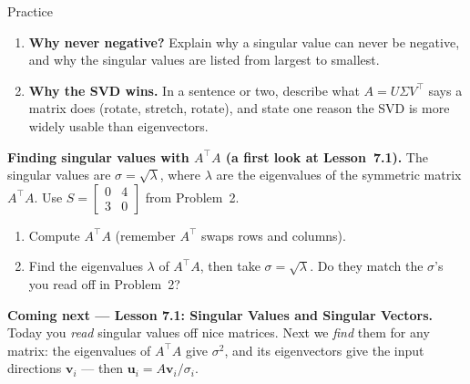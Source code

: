\documentclass[10pt]{article}
\newcommand{\uu}{\mathbf{u}}
\newcommand{\vv}{\mathbf{v}}
\newcommand{\T}{^{\top}}
\begin{document}
\begin{notesbox}{Practice}
\begin{enumerate}[leftmargin=1.9em, itemsep=12pt]
        perpendicular eigenvectors. Compute $A\begin{bmatrix} 1 \\ 1 \end{bmatrix}$ and
        $A\begin{bmatrix} 1 \\ -1 \end{bmatrix}$, and read off the singular values. 
  \item \textbf{Why never negative?} Explain why a singular value can never be negative, and why the
        singular values are listed from largest to smallest. 
  \item \textbf{Why the SVD wins.} In a sentence or two, describe what $A=U\Sigma V\T$ says a matrix does
        (rotate, stretch, rotate), and state one reason the SVD is more widely usable than eigenvectors.
\end{enumerate}
\end{notesbox}

\begin{extensionbox}
\textbf{Finding singular values with $A\T A$ (a first look at Lesson~7.1).} The singular values are
$\sigma=\sqrt{\lambda}$, where $\lambda$ are the eigenvalues of the symmetric matrix $A\T A$. Use
$S=\begin{bmatrix} 0 & 4 \\ 3 & 0 \end{bmatrix}$ from Problem~2.
\begin{enumerate}[label=(\alph*), leftmargin=1.8em, itemsep=5pt]
  \item Compute $A\T A$ (remember $A\T$ swaps rows and columns).
  \item Find the eigenvalues $\lambda$ of $A\T A$, then take $\sigma=\sqrt{\lambda}$. Do they match the
        $\sigma$'s you read off in Problem~2?
\end{enumerate}
\end{extensionbox}

\begin{spiralbox}
\textbf{Coming next --- Lesson 7.1: Singular Values and Singular Vectors.} Today you \emph{read} singular
values off nice matrices. Next we \emph{find} them for any matrix: the eigenvalues of $A\T A$ give
$\sigma^2$, and its eigenvectors give the input directions $\vv_i$ --- then $\uu_i=A\vv_i/\sigma_i$.
\end{spiralbox}
\end{document}
